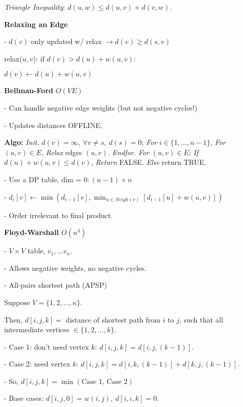\documentclass[8pt, letterpaper]{extarticle}
\begin{document}
\begin{minipage}[t]{0.45\textwidth}
\emph{Triangle Inequality}: $d(u,w) \leq d(u,v) + d(v,w)$.

\textbf{Relaxing an Edge}

- $d(v)$ only updated w/ relax $\rightarrow d(v) \geq d(s, v)$

relax($u, v$): if $d(v) > d(u) + w(u, v)$:

\hspace{0.5cm} $d(v) \leftarrow d(u) + w(u, v)$

\textbf{Bellman-Ford} $O(VE)$

- Can handle negative edge weights (but not negative cycles!)

- Updates distances OFFLINE.

{\small \textbf{Algo:}} \emph{Init.} $d(v) = \infty,\ \forall v \neq s,\ d(s) = 0$; \emph{For} $i \in \{1,...,n-1\}$, \emph{For} $(u,v) \in E$, \emph{Relax} edges $(u,v)$. \emph{Endfor.} \emph{For} $(u,v) \in E$; \emph{If } $d(u) + w(u,v) \leq d(v)$, \emph{Return} FALSE. \emph{Else} return TRUE.

- Use a DP table, dim = $0:(n-1) \times n$

- $d_{i}[v] \leftarrow \min(d_{i-1}[v], \min_{u \in Neigh(v)}[d_{i-1}[u] + w(u,v)])$

- Order irrelevant to final product.

\textbf{Floyd-Warshall} $O(n^3)$

- $V \times V$ table, $v_1,...v_n$.

- Allows negative weights, no negative cycles.

- All-pairs shortest path (APSP)

Suppose $V = \{1, 2, \ldots, n\}$. 

Then, $d[i,j,k] = $ distance of shortest path from $i$ to $j$, such that all intermediate vertices $\in \{1, 2, \ldots, k\}$.

- Case 1: don't need vertex $k$: $d[i,j,k] = d[i,j,(k-1)]$.

- Case 2: need vertex $k$: $d[i,j,k] = d[i,k,(k-1)] + d[k,j,(k-1)]$.

- So, $d[i,j,k] = \min(\text{Case 1, Case 2})$

- Base cases: $d[i,j,0] = w(i,j), \ d[i,i,k] = 0$.


\end{minipage}

\newpage
\end{document}
